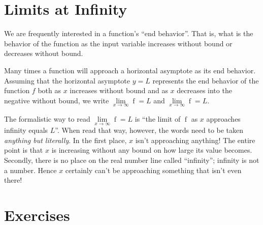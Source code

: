 \documentclass[12pt,]{book}
\theoremstyle{plain}
\theoremstyle{definition}
\numberwithin{equation}{section}
\newcommand{\fe}[2]{\mathop{{#1}{\left(#2\right)}}}
\begin{document}
\section[Limits at Infinity]{Limits at Infinity}\label{section-limits-at-infinity}
We are frequently interested in a function's ``end behavior''. That is, what is the behavior of the function as the input variable increases without bound or decreases without bound.%
\par
Many times a function will approach a horizontal asymptote as its end behavior. Assuming that the horizontal asymptote \(y=L\) represents the end behavior of the function \(f\) both as \(x\) increases without bound and as \(x\) decreases into the negative without bound, we write \(\lim\limits_{x\to\infty}\fe{f}{x}=L\) and \(\lim\limits_{x\to\infty}\fe{f}{x}=L\).%
\par
The formalistic way to read \(\lim\limits_{x\to\infty}\fe{f}{x}=L\) is ``the limit of \(\fe{f}{x}\) as \(x\) approaches infinity equals \(L\)''. When read that way, however, the words need to be taken \emph{anything but literally}. In the first place, \(x\) isn't approaching anything! The entire point is that \(x\) is increasing without any bound on how large its value becomes. Secondly, there is no place on the real number line called ``infinity''; infinity is not a number. Hence \(x\) certainly can't be approaching something that isn’t even there!%
\typeout{************************************************}
\typeout{************************************************}
\section*{Exercises}\label{exercises-7}
\end{document}
